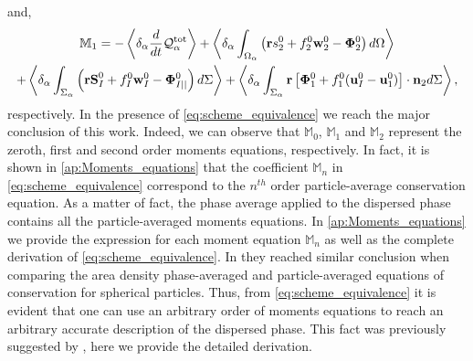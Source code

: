 and,
\begin{multline*}
    \mathbb{M}_1 =
    -  \left<\delta_\alpha \frac{d}{d t} \mathcal{Q}_\alpha^\text{tot}\right>
     + \left<\delta_\alpha\int_{\Omega_\alpha} \left(
        \textbf{r} s_2^0         
        + f_2^0  \textbf{w}_2^0 
        - \mathbf{\Phi}_2^0
    \right) d\Omega\right>\\
    + \left<\delta_\alpha\int_{\Sigma_\alpha} \left(
        \textbf{r}\textbf{S}_I^0
        + f_I^0 \textbf{w}_I^0
        - \mathbf{\Phi}_{I||}^0
    \right) d\Sigma\right>
    + \left<\delta_\alpha\int_{\Sigma_\alpha} \textbf{r} \left[
        \mathbf{\Phi}_1^0
        + f_1^0 (\textbf{u}_I^0-\textbf{u}_1^0)
    \right]\cdot \textbf{n}_2  d\Sigma\right>,
\end{multline*}
respectively. 
In the presence of \ref{eq:scheme_equivalence} we reach the major conclusion of this work. 
Indeed, we can observe that $\mathbb{M}_0$, $\mathbb{M}_1$ and $\mathbb{M}_2$ represent the zeroth, first and second order moments equations, respectively. 
In fact, it is shown in \ref{ap:Moments_equations} that the coefficient $\mathbb{M}_n$ in \ref{eq:scheme_equivalence} correspond to the $n^{th}$ order particle-average conservation equation. 
As a matter of fact, the phase average applied to the dispersed phase contains all the particle-averaged moments equations.
In \ref{ap:Moments_equations} we provide the expression for each moment equation $\mathbb{M}_n$ as well as the complete derivation of \ref{eq:scheme_equivalence}. 
In \cite{lhuillier2000bilan} they reached similar conclusion when comparing the area density phase-averaged and particle-averaged equations of conservation for spherical particles. 
Thus, from \ref{eq:scheme_equivalence} it is evident that one can use an arbitrary order of moments equations to reach an arbitrary accurate description of the dispersed phase.
This fact was previously suggested by \citet{zhang1997momentum}, here we provide the detailed derivation.  

